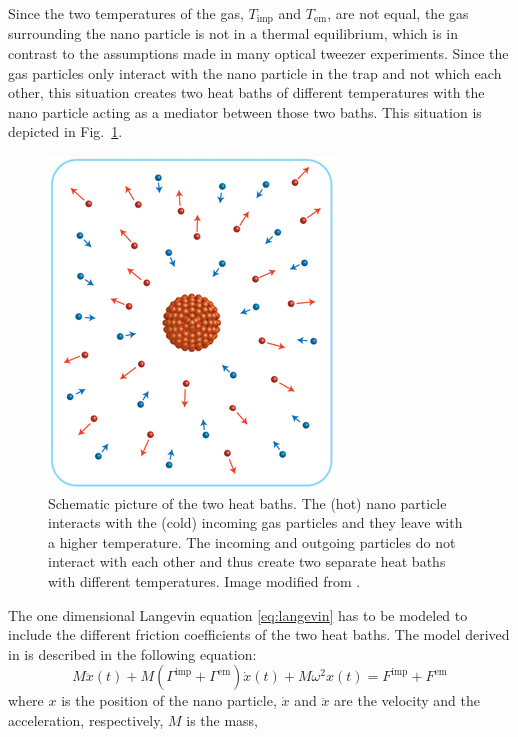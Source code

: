 \documentclass[12pt]{article}
\begin{document}
Since the two temperatures of the gas, $T_\text{imp}$ and $T_\text{em}$, are not equal, the gas surrounding the nano particle is not in a thermal
equilibrium, which is in contrast to the assumptions made in many optical tweezer experiments. Since the gas particles only interact with the nano particle
in the trap and not which each other, this situation creates two heat baths of different temperatures with the nano particle acting as a mediator
between those two baths. This situation is depicted in
Fig.~\ref{fig:heatbaths}.
\begin{figure}[H]
    \begin{center}
        \includegraphics[scale=0.5]{images/nano_nonequilibrium_cropped.jpg}
        \caption{Schematic picture of the two heat baths. The (hot) nano particle interacts with the (cold) incoming gas particles and they leave with
        a higher temperature. The incoming and outgoing particles do not interact with each other and thus create two separate heat baths with
    different temperatures. Image modified from \cite{Kroy2014}.}
        \label{fig:heatbaths}
    \end{center}
\end{figure}
The one dimensional Langevin equation \eqref{eq:langevin} has to be modeled to include the different friction coefficients of the two heat baths. The
model derived in \cite{MillenJ.2014} is described in the following equation:
\begin{equation}
    M\ddot{x}(t) + M\left(\Gamma^\text{imp}+\Gamma^\text{em}\right)\dot{x}(t) + M\omega^2x(t) =F^\text{imp}+F^\text{em}
\end{equation}
where $x$ is the position of the nano particle, $\dot{x}$ and $\ddot{x}$ are the velocity and the acceleration, respectively, $M$ is the mass,
\end{document}
